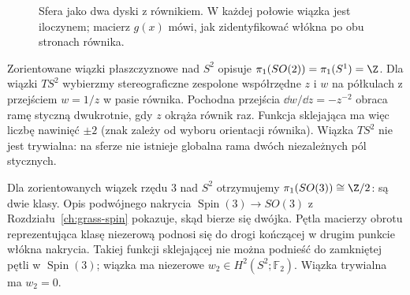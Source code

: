 \begin{figure}[htbp]
\centering
{}
\caption{Sfera jako dwa dyski z równikiem.
W każdej połowie wiązka jest iloczynem;
macierz $g(x)$ mówi, jak zidentyfikować
włókna po obu stronach równika.}
\label{fig:clutching-16}
\end{figure}

\begin{przyklad}
Zorientowane wiązki płaszczyznowe
nad $S^2$ opisuje
$\pi_1(SO(2))=\pi_1(S^1)=\Z$.
Dla wiązki $TS^2$ wybierzmy
stereograficzne zespolone
współrzędne $z$ i $w$
na półkulach z przejściem
$w=1/z$ w pasie równika.
Pochodna przejścia
$\dd w/\dd z=-z^{-2}$
obraca ramę styczną
dwukrotnie, gdy $z$
okrąża równik raz.
Funkcja sklejająca ma
więc liczbę nawinięć
$\pm2$ (znak zależy
od wyboru orientacji
równika). Wiązka $TS^2$
nie jest trywialna:
na sferze nie istnieje
globalna rama dwóch
niezależnych pól stycznych.
\end{przyklad}

\begin{przyklad}
Dla zorientowanych wiązek
rzędu $3$ nad $S^2$
otrzymujemy
$\pi_1(SO(3))\cong\Z/2$:
są dwie klasy.
Opis podwójnego nakrycia
$\operatorname{Spin}(3)\to SO(3)$
z Rozdziału~\ref{ch:grass-spin}
pokazuje, skąd bierze się
dwójka. Pętla macierzy
obrotu reprezentująca
klasę niezerową podnosi
się do drogi kończącej
w drugim punkcie włókna
nakrycia. Takiej
funkcji sklejającej
nie można podnieść
do zamkniętej pętli
w $\operatorname{Spin}(3)$;
wiązka ma niezerowe
$w_2\in H^2(S^2;\mathbb F_2)$.
Wiązka trywialna ma
$w_2=0$.
\end{przyklad}

